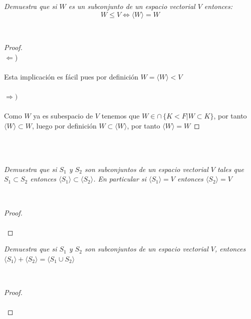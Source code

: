 \documentclass[11pt,letterpaper]{article}
\begin{document}
\begin{tcolorbox}[
	title = \textcolor{black}{\textcolor{white}{Problema 5}},]
\textit{Demuestra que si $W$ es un subconjunto de un espacio vectorial $V$ entonces:\,\\
\begin{equation*}
    W\leq V \iff \langle W \rangle=W 
\end{equation*}
}
\end{tcolorbox}\,\\
\begin{proof}\,\\
    $\Leftarrow$)\,\\
    \,\\
    Esta implicaci\'on es f\'acil pues por definici\'on $W=\langle W \rangle<V$\,\\
    \,\\
    $\Rightarrow)$\,\\
    \,\\
    Como $W$ ya es subespacio de $V$ tenemos que $W\in\cap\,\{K<F| W\subset K\} $, por tanto $\langle W \rangle\subset W$, luego
    por definici\'on $W\subset \langle W \rangle$, por tanto $\langle W \rangle=W$
\end{proof}\,\\
\,\\
\begin{tcolorbox}[
	title = \textcolor{black}{\textcolor{white}{Problema 6}},]
\textit{Demuestra que si $S_1$ y $S_2$ son subconjuntos de un espacio vectorial $V$ tales que $S_1\subset S_2$
entonces $\langle S_1 \rangle \subset \langle S_2 \rangle$. En particular si $\langle S_1 \rangle =V$ entonces $\langle S_2 \rangle =V$
}
\end{tcolorbox}\,\\
\begin{proof}\,\\
    \,\\
\end{proof}
\begin{tcolorbox}[
	title = \textcolor{black}{\textcolor{white}{Problema 7}},]
\textit{Demuestra que si $S_1$ y $S_2$ son subconjuntos de un espacio vectorial $V$, entonces
$\langle S_1 \rangle+ \langle  S_2\rangle=\langle S_1\cup S_2 \rangle  $
}
\end{tcolorbox}\,\\
\begin{proof}\,\\
    \,\\
\end{proof}
\end{document}
